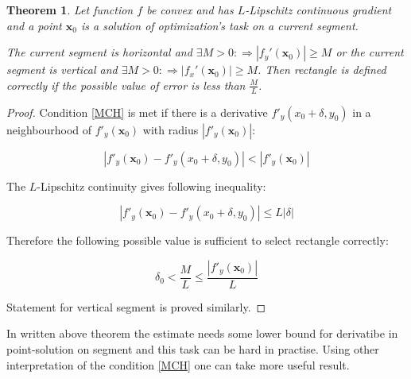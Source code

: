 \documentclass[12pt]{article}
\newtheorem{theorem}{Theorem}[section]
\begin{document}
\begin{theorem}
\label{ConstGrad}
Let function $f$ be convex and has $L$-Lipschitz continuous gradient and a point $\textbf{x}_0$ is a solution of optimization's  task on a current segment. 

The current segment is horizontal and $\exists M>0  : \Rightarrow|f_y'(\textbf{x}_0)| \geq M$ or the current segment is vertical and $\exists M>0  : \Rightarrow|f_x'(\textbf{x}_0)| \geq M$. Then rectangle is defined correctly if the possible value of error is less than $\frac{M}{L}$.
\end{theorem}
\begin{proof}
Condition \eqref{MCH} is met if there is a derivative $f'_y(x_0+\delta, y_0)$ in a neighbourhood of 
$f'_y(\textbf{x}_0)$ with radius $\left|f'_y(\textbf{x}_0)\right|$:

$$\left|f'_y(\textbf{x}_0) - f'_y(x_0+\delta, y_0)\right|<\left|f'_y(\textbf{x}_0)\right|$$

The $L$-Lipschitz continuity gives following inequality:

$$\left|f'_y(\textbf{x}_0) - f'_y(x_0+\delta, y_0)\right| \leq L|\delta|$$

Therefore the following possible value is sufficient to select rectangle correctly:

$$\delta_0 < \frac{M}{L} \leq \frac{\left|f'_y(\textbf{x}_0)\right|}{L}$$

Statement for vertical segment is proved similarly.
\end{proof}

In written above theorem the estimate needs some lower bound for derivatibe in point-solution on segment and this task can be hard in practise. Using other interpretation of the condition \eqref{MCH} one can take more useful result.
\end{document}
